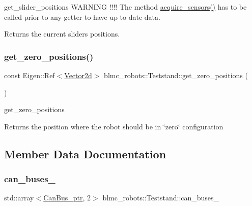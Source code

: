 get\+\_\+slider\+\_\+positions W\+A\+R\+N\+I\+NG !!!! The method \hyperlink{classblmc__robots_1_1Teststand_a4203e25148ab5b4ddfef3b46647213c6}{acquire\+\_\+sensors()} has to be called prior to any getter to have up to date data. 

\begin{DoxyReturn}{Returns}
the current sliders positions. 
\end{DoxyReturn}
\mbox{\label{classblmc__robots_1_1Teststand_adbceb17de729cced8e9985b9177efa7c}} 
\subsubsection{\texorpdfstring{get\+\_\+zero\+\_\+positions()}{get\_zero\_positions()}}
{\footnotesize\ttfamily const Eigen\+::\+Ref$<$\hyperlink{common__header_8hpp_acb6916bc8c9fe9d98c484fd4cc201447}{Vector2d}$>$ blmc\+\_\+robots\+::\+Teststand\+::get\+\_\+zero\+\_\+positions (\begin{DoxyParamCaption}{ }\end{DoxyParamCaption})\hspace{0.3cm}{\ttfamily [inline]}}



get\+\_\+zero\+\_\+positions 

\begin{DoxyReturn}{Returns}
the position where the robot should be in \char`\"{}zero\char`\"{} configuration 
\end{DoxyReturn}


\subsection{Member Data Documentation}
\mbox{\label{classblmc__robots_1_1Teststand_aab9d6924ad67f65a6931d3db4771c28a}} 
\subsubsection{\texorpdfstring{can\+\_\+buses\+\_\+}{can\_buses\_}}
{\footnotesize\ttfamily std\+::array$<$\hyperlink{common__header_8hpp_a793c8789a7598e8aaf766939da7262af}{Can\+Bus\+\_\+ptr}, 2$>$ blmc\+\_\+robots\+::\+Teststand\+::can\+\_\+buses\+\_\+\hspace{0.3cm}{\ttfamily [private]}}



